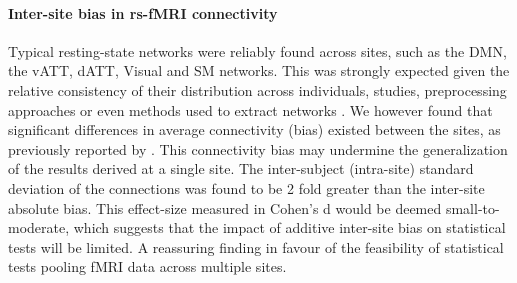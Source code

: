 \documentclass[authoryear]{elsarticle}
\begin{document}
\paragraph{Inter-site bias in rs-fMRI connectivity} Typical resting-state networks were reliably found across sites, such as the DMN, the vATT, dATT, Visual and SM networks. This was strongly expected given the relative consistency of their distribution across individuals, studies, preprocessing approaches or even methods used to extract networks \citep{Damoiseaux2006,vandeheuvel2008,Bellec2010c,Yeo2011,Power2011}. We however found that significant differences in average connectivity (bias) existed between the sites, as previously reported by \citep{Yan2013a}. This connectivity bias may undermine the generalization of the results derived at a single site. The inter-subject (intra-site) standard deviation of the connections was found to be 2 fold greater than the inter-site absolute bias. This effect-size measured in Cohen's d would be deemed small-to-moderate, which suggests that the impact of additive inter-site bias on statistical tests will be limited. A reassuring finding in favour of the feasibility of statistical tests pooling fMRI data across multiple sites.\\

\end{document}
